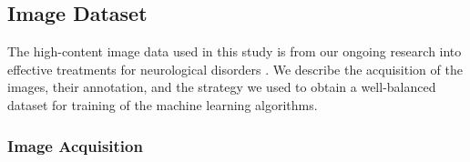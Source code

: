 \subsection{Image Dataset}
\label{sec:data}

The high-content image data used in this study is from our ongoing research into effective treatments for neurological disorders \cite{cuesto2011phosphoinositide, enriquez2014learning, enriquez2016pi3k}. We describe the acquisition of the images, their annotation, and the strategy we used to obtain a well-balanced dataset for training of the machine learning algorithms.

\subsubsection{Image Acquisition}
\label{sec:acquisition}

